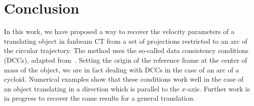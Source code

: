 \documentclass[twocolumn]{IEEEtran}
\begin{document}
\section{Conclusion}
In this work, we have proposed a way to recover the velocity parameters of a translating object in fanbeam CT from a set of projections restricted to an arc of the circular trajectory. The method uses the so-called data consistency conditions (DCCs), adapted from~\cite{clackdoyle2015consistency}. Setting the origin of the reference frame at the center of mass of the object, we are in fact dealing with DCCs in the case of an arc of a cycloid. Numerical examples show that these conditions work well in the case of an object translating in a direction which is parallel to the $x$-axis. Further work is in progress to recover the same results for a general translation.




\end{document}
